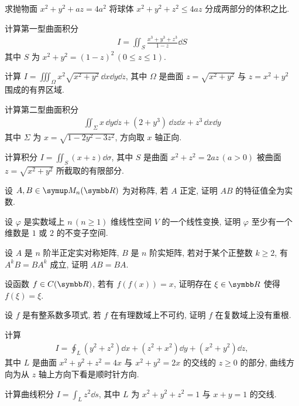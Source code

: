 \documentclass{ctexart}
\begin{document}
\begin{exercise}[resume=exer]
        \item 求抛物面 $ x^{2} + y^{2} + az = 4a^{2} $ 将球体 $ x^{2} + y^{2} + z^{2} \le 4az $ 分成两部分的体积之比.
        \item 计算第一型曲面积分
        \begin{align*}
            I = \iint_{S} \frac{x^{3} + y^{3} + z^{3}}{1-z} \dd{S}
        \end{align*}
        其中 $ S $ 为 $ x^{2} + y^{2} = (1-z)^{2}\,(0 \le z \le 1) $. 
        \item 计算 $ I = \iiint_{\Omega} x^{2}\sqrt{x^{2} + y^{2}}\,\dd x\dd y\dd z $, 其中 $ \Omega $ 是曲面 $ z = \sqrt{x^{2} + y^{2}} $ 与 $ z = x^{2} + y^{2} $ 围成的有界区域.
        \item 计算第二型曲面积分
        \begin{align*}
            \iint_{\Sigma} x\,\dd y\dd z + (2 + y^{3})\,\dd z\dd x + z^{3}\,\dd x\dd y
        \end{align*}
        其中 $ \Sigma $ 为 $ x = \sqrt{1 - 2y^{2} - 3z^{2}} $, 方向取 $ x $ 轴正向.
        \item 计算积分 $ I = \iint_{S} (x + z) \dd{\sigma} $, 其中 $ S $ 是曲面 $ x^{2} + z^{2} = 2az\,(a > 0) $ 被曲面 $ z = \sqrt{x^{2} + y^{2}} $ 所截取的有限部分.
        \item 设 $ A, B \in \MM $ 为对称阵, 若 $ A $ 正定, 证明 $ AB $ 的特征值全为实数.
        \item 设 $ \varphi $ 是实数域上 $ n\,(n\ge 1) $ 维线性空间 $ V $ 的一个线性变换, 证明 $ \varphi $ 至少有一个维数是 $ 1 $ 或 $ 2 $ 的不变子空间.
        \item 设 $ A $ 是 $ n $ 阶半正定实对称矩阵, $ B $ 是 $ n $ 阶实矩阵, 若对于某个正整数 $ k \ge 2 $, 有 $ A^{k}B = BA^{k} $ 成立, 证明 $ AB = BA $. 
        \item 设函数 $ f \in C(\R) $, 若有 $ f(f(x)) = x $, 证明存在 $ \xi\in \R $ 使得 $ f(\xi) = \xi $.
        \item 设 $ f $ 是有整系数多项式, 若 $ f $ 在有理数域上不可约, 证明 $ f $ 在复数域上没有重根. 
        \item 计算 
        \begin{align*}
            I = \oint_{L} (y^{2} + z^{2}) \dd{x} + (z^{2} + x^{2}) \dd{y} + (x^{2} + y^{2}) \dd{z},
        \end{align*}
        其中 $ L $ 是曲面 $ x^{2} + y^{2} + z^{2} = 4x $ 与 $ x^{2} + y^{2} = 2x $ 的交线的 $ z \ge 0 $ 的部分, 曲线方向为从 $ z $ 轴上方向下看是顺时针方向.
        \item 计算曲线积分 $ I = \int_{L} z^{2} \dd{s} $, 其中 $ L $ 为 $ x^{2} + y^{2} + z^{2} = 1 $ 与 $ x + y = 1 $ 的交线.

\end{exercise}
\end{document}

